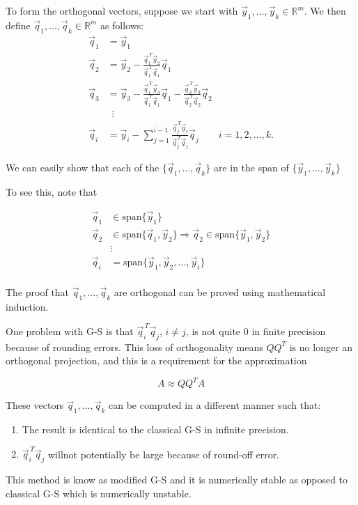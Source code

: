 To form the orthogonal vectors, suppose we start with $\vec{y}_1, \ldots, \vec{y}_k \in\mathbb{R}^m$. We then define $\vec{q}_1, \ldots, \vec{q}_k \in\mathbb{R}^m$ as follows:
\begin{align*}
    \vec{q}_1 &= \vec{y}_1 \\
    \vec{q}_2 &= \vec{y}_2 - \frac{\vec{q}^{\,T}_1\vec{y}_2}{\vec{q}_1^{\,T}\vec{q}_1}\vec{q}_1\\
    \vec{q}_3 &= \vec{y}_3 - \frac{\vec{q}^{\,T}_1\vec{y}_3}{\vec{q}_1^{\,T}\vec{q}_1}\vec{q}_1
    -
    \frac{\vec{q}^{\,T}_2\vec{y}_3}{\vec{q}_2^{\,T}\vec{q}_2}\vec{q}_2
    \\
    &\enspace\vdots \\
    \vec{q}_i &= \vec{y}_i - \sum_{j=1}^{i-1} \frac{\vec{q}^{\,T}_j\vec{y}_i}{\vec{q}_j^{\,T}\vec{q}_j}\vec{q}_j \qquad i=1, 2, \ldots, k.
\end{align*}

We can easily show that each of the $\{\vec{q}_1, \ldots, \vec{q}_{k}\}$ are in the span of $\{\vec{y}_1, \ldots, \vec{y}_{k}\}$

To see this, note that

\begin{align*}
    \vec{q}_1 &\in \text{span} \{ \vec{y}_1 \} \\
    \vec{q}_2 &\in \text{span} \{ \vec{q}_1, \vec{y}_2 \}
    \Rightarrow
    \vec{q}_2 \in \text{span} \{ \vec{y}_1, \vec{y}_2 \}
    \\
    &\vdots\\
    \vec{q}_i &= \text{span} \{ \vec{y}_1, \vec{y}_2, \ldots, \vec{y}_i \} \\
\end{align*}

The proof that $\vec{q}_1, \ldots, \vec{q}_{k}$ are orthogonal can be proved using mathematical induction.

One problem with G-S is that $\vec{q}^{\,T}_i\vec{q}_j$, $i \neq j$, is not quite 0 in finite precision because of rounding errors. This loss of orthogonality means $QQ^T$ is no longer an orthogonal projection, and this is a requirement for the approximation

\begin{equation*}
    A \approx QQ^TA
\end{equation*}

These vectors $\vec{q}_1, \ldots, \vec{q}_{k}$ can be computed in a different manner such that:

\begin{enumerate}[1)]
    \item The result is identical to the classical G-S in infinite precision.
    \item $\vec{q}^{\,T}_i\vec{q}_j$ willnot potentially be large because of round-off error.
\end{enumerate}
This method is know as modified G-S and it is numerically stable as opposed to classical G-S which is numerically unstable.

